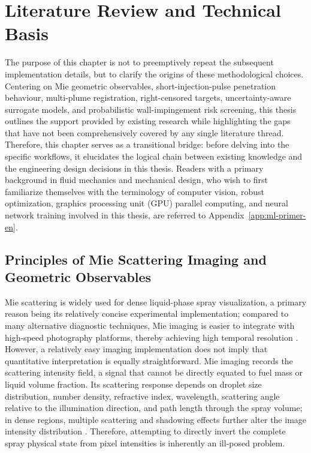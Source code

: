 \section{Literature Review and Technical Basis}

The purpose of this chapter is not to preemptively repeat the subsequent implementation details, but to clarify the origins of these methodological choices.
Centering on Mie geometric observables, short-injection-pulse penetration behaviour, multi-plume registration, right-censored targets, uncertainty-aware surrogate models, and probabilistic wall-impingement risk screening, this thesis outlines the support provided by existing research while highlighting the gaps that have not been comprehensively covered by any single literature thread.
Therefore, this chapter serves as a transitional bridge:
before delving into the specific workflows, it elucidates the logical chain between existing knowledge and the engineering design decisions in this thesis.
Readers with a primary background in fluid mechanics and mechanical design, who wish to first familiarize themselves with the terminology of computer vision, robust optimization, graphics processing unit (GPU) parallel computing, and neural network training involved in this thesis, are referred to Appendix~\ref{app:ml-primer-en}.

\subsection{Principles of Mie Scattering Imaging and Geometric Observables}

Mie scattering is widely used for dense liquid-phase spray visualization, a primary reason being its relatively concise experimental implementation;
compared to many alternative diagnostic techniques, Mie imaging is easier to integrate with high-speed photography platforms, thereby achieving high temporal resolution \cite{Linne2013SprayImaging}.
However, a relatively easy imaging implementation does not imply that quantitative interpretation is equally straightforward.
Mie imaging records the scattering intensity field, a signal that cannot be directly equated to fuel mass or liquid volume fraction.
Its scattering response depends on droplet size distribution, number density, refractive index, wavelength, scattering angle relative to the illumination direction, and path length through the spray volume; in dense regions, multiple scattering and shadowing effects further alter the image intensity distribution \cite{BohrenHuffman2004,Linne2013SprayImaging}.
Therefore, attempting to directly invert the complete spray physical state from pixel intensities is inherently an ill-posed problem.

